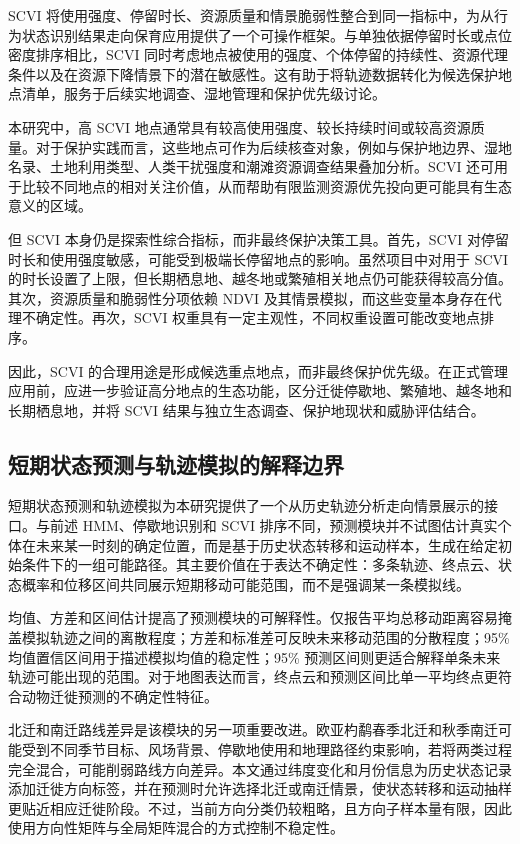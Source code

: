 \documentclass[UTF8,a4paper,12pt]{ctexart}
\begin{document}
SCVI 将使用强度、停留时长、资源质量和情景脆弱性整合到同一指标中，为从行为状态识别结果走向保育应用提供了一个可操作框架。与单独依据停留时长或点位密度排序相比，SCVI 同时考虑地点被使用的强度、个体停留的持续性、资源代理条件以及在资源下降情景下的潜在敏感性。这有助于将轨迹数据转化为候选保护地点清单，服务于后续实地调查、湿地管理和保护优先级讨论。

本研究中，高 SCVI 地点通常具有较高使用强度、较长持续时间或较高资源质量。对于保护实践而言，这些地点可作为后续核查对象，例如与保护地边界、湿地名录、土地利用类型、人类干扰强度和潮滩资源调查结果叠加分析。SCVI 还可用于比较不同地点的相对关注价值，从而帮助有限监测资源优先投向更可能具有生态意义的区域。

但 SCVI 本身仍是探索性综合指标，而非最终保护决策工具。首先，SCVI 对停留时长和使用强度敏感，可能受到极端长停留地点的影响。虽然项目中对用于 SCVI 的时长设置了上限，但长期栖息地、越冬地或繁殖相关地点仍可能获得较高分值。其次，资源质量和脆弱性分项依赖 NDVI 及其情景模拟，而这些变量本身存在代理不确定性。再次，SCVI 权重具有一定主观性，不同权重设置可能改变地点排序。

因此，SCVI 的合理用途是形成候选重点地点，而非最终保护优先级。在正式管理应用前，应进一步验证高分地点的生态功能，区分迁徙停歇地、繁殖地、越冬地和长期栖息地，并将 SCVI 结果与独立生态调查、保护地现状和威胁评估结合。

\subsection{短期状态预测与轨迹模拟的解释边界}

短期状态预测和轨迹模拟为本研究提供了一个从历史轨迹分析走向情景展示的接口。与前述 HMM、停歇地识别和 SCVI 排序不同，预测模块并不试图估计真实个体在未来某一时刻的确定位置，而是基于历史状态转移和运动样本，生成在给定初始条件下的一组可能路径。其主要价值在于表达不确定性：多条轨迹、终点云、状态概率和位移区间共同展示短期移动可能范围，而不是强调某一条模拟线。

均值、方差和区间估计提高了预测模块的可解释性。仅报告平均总移动距离容易掩盖模拟轨迹之间的离散程度；方差和标准差可反映未来移动范围的分散程度；95\% 均值置信区间用于描述模拟均值的稳定性；95\% 预测区间则更适合解释单条未来轨迹可能出现的范围。对于地图表达而言，终点云和预测区间比单一平均终点更符合动物迁徙预测的不确定性特征。

北迁和南迁路线差异是该模块的另一项重要改进。欧亚杓鹬春季北迁和秋季南迁可能受到不同季节目标、风场背景、停歇地使用和地理路径约束影响，若将两类过程完全混合，可能削弱路线方向差异。本文通过纬度变化和月份信息为历史状态记录添加迁徙方向标签，并在预测时允许选择北迁或南迁情景，使状态转移和运动抽样更贴近相应迁徙阶段。不过，当前方向分类仍较粗略，且方向子样本量有限，因此使用方向性矩阵与全局矩阵混合的方式控制不稳定性。
\end{document}

